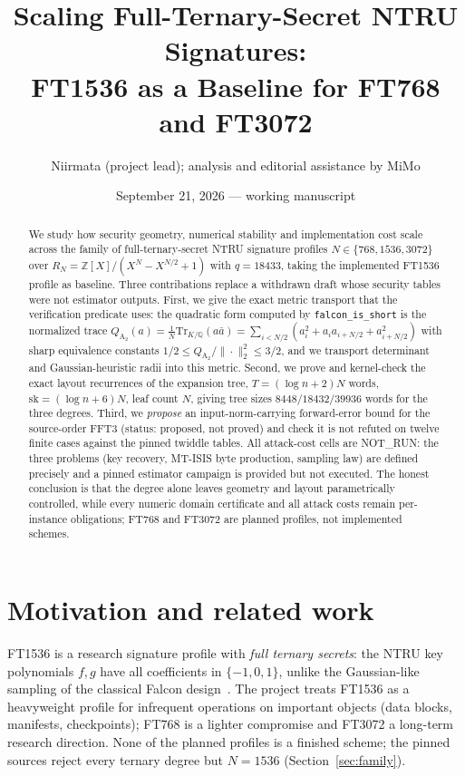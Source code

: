 \documentclass[11pt,a4paper]{article}
\title{Scaling Full-Ternary-Secret NTRU Signatures:\\
FT1536 as a Baseline for FT768 and FT3072}
\author{Niirmata (project lead); analysis and editorial assistance by MiMo}
\date{September 21, 2026 --- working manuscript}
\theoremstyle{remark}
\newcommand{\Atwo}{Q_{\mathrm{A}_2}}
\newcommand{\NOTRUN}{\textsf{NOT\_RUN}}
\begin{document}
\maketitle

\begin{abstract}
We study how security geometry, numerical stability and implementation cost
scale across the family of full-ternary-secret NTRU signature profiles
$N\in\{768,1536,3072\}$ over $R_N=\mathbb Z[X]/(X^N-X^{N/2}+1)$ with
$q=18433$, taking the implemented FT1536 profile as baseline. Three
contribations replace a withdrawn draft whose security tables were not
estimator outputs. First, we give the exact metric transport that the
verification predicate uses: the quadratic form computed by
\texttt{falcon\_is\_short} is the normalized trace
$\Atwo(a)=\tfrac1N\mathrm{Tr}_{K/\mathbb Q}(a\bar a)=\sum_{i<N/2}(a_i^2+a_ia_{i+N/2}+a_{i+N/2}^2)$
with sharp equivalence constants $1/2\le \Atwo/\|\cdot\|_2^2\le 3/2$, and we
transport determinant and Gaussian-heuristic radii into this metric. Second,
we prove and kernel-check the exact layout recurrences of the expansion tree,
$T=(\log n+2)N$ words, $\mathrm{sk}=(\log n+6)N$, leaf count $N$, giving
tree sizes $8448/18432/39936$ words for the three degrees. Third, we
\emph{propose} an input-norm-carrying forward-error bound for the
source-order FFT3 (status: proposed, not proved) and check it is not refuted
on twelve finite cases against the pinned twiddle tables. All attack-cost cells are
\NOTRUN: the three problems (key recovery, MT-ISIS byte production, sampling
law) are defined precisely and a pinned estimator campaign is provided but
not executed. The honest conclusion is that the degree alone leaves geometry
and layout parametrically controlled, while every numeric domain certificate
and all attack costs remain per-instance obligations; FT768 and FT3072 are
planned profiles, not implemented schemes.
\end{abstract}

\section{Motivation and related work}
\label{sec:motiv}

FT1536 is a research signature profile with \emph{full ternary secrets}: the
NTRU key polynomials $f,g$ have all coefficients in $\{-1,0,1\}$, unlike the
Gaussian-like sampling of the classical Falcon design~\cite{falcon-spec}.
The project treats FT1536 as a heavyweight profile for infrequent operations
on important objects (data blocks, manifests, checkpoints); FT768 is a
lighter compromise and FT3072 a long-term research direction. None of the
planned profiles is a finished scheme; the pinned sources reject every
ternary degree but $N=1536$ (Section~\ref{sec:family}).
\end{document}
